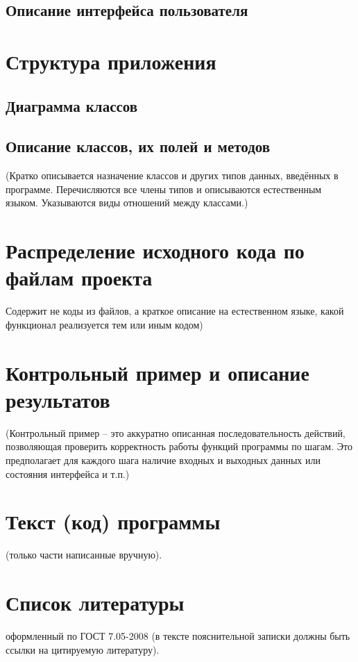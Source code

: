 \documentclass[a4paper,12pt, fleqn]{article}
\theoremstyle{plain} %
\theoremstyle{definition} %
\theoremstyle{remark} %
\numberwithin{equation}{section}
\begin{document}
\subsection{Описание интерфейса пользователя}


\section{Структура приложения}

\subsection{Диаграмма классов}

\subsection{Описание классов, их полей и методов}
(Кратко описывается назначение классов и других типов данных, введённых в программе. Перечисляются все члены типов и описываются естественным языком. Указываются виды отношений между классами.)


\section{Распределение исходного кода по файлам проекта}
Содержит не коды из файлов, а краткое описание на естественном языке, какой функционал реализуется тем или иным кодом)


\section{Контрольный пример и описание результатов}
(Контрольный пример – это аккуратно описанная последовательность действий, позволяющая проверить корректность работы функций программы по шагам. Это предполагает для каждого шага наличие входных и выходных данных или состояния интерфейса и т.п.)


\section{Текст (код) программы}
(только части написанные вручную).


\section{Список литературы}
оформленный по ГОСТ 7.05-2008 (в тексте пояснительной записки должны быть ссылки на цитируемую литературу). 
\end{document}
